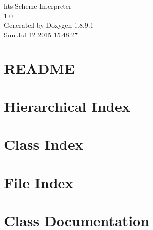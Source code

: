 \documentclass[twoside]{book}
\newcommand{\+}{\discretionary{\mbox{\scriptsize$\hookleftarrow$}}{}{}}
\newcommand{\clearemptydoublepage}{%
  \newpage{\pagestyle{empty}\cleardoublepage}%
}
\begin{document}
\hypersetup{pageanchor=false,
             bookmarks=true,
             bookmarksnumbered=true,
             pdfencoding=unicode
            }
\begin{titlepage}
\vspace*{7cm}
\begin{center}%
{\Large ht\textquotesingle{}s Scheme Interpreter \\[1ex]\large 1.\+0 }\\
\vspace*{1cm}
{\large Generated by Doxygen 1.8.9.1}\\
\vspace*{0.5cm}
{\small Sun Jul 12 2015 15:48:27}\\
\end{center}
\end{titlepage}
\clearemptydoublepage
\tableofcontents
\clearemptydoublepage
{}
\hypersetup{pageanchor=true}

\chapter{R\+E\+A\+D\+M\+E}
\label{md__r_e_a_d_m_e}
\hypertarget{md__r_e_a_d_m_e}{}

\chapter{Hierarchical Index}

\chapter{Class Index}

\chapter{File Index}

\chapter{Class Documentation}














\end{document}
